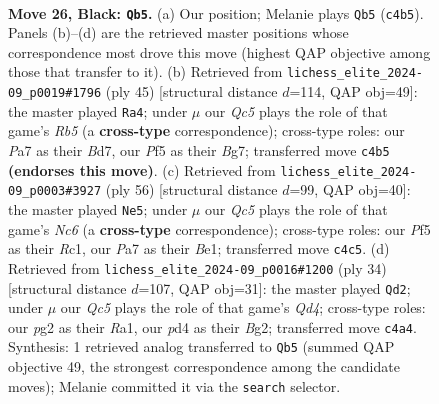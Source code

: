 \documentclass[11pt]{article}
\begin{document}
\clearpage

\begin{figure}[p]\centering
\begin{subfigure}{0.46\textwidth}\centering
\resizebox{\linewidth}{!}{%
\newchessgame
\chessboard[
  setfen={rk3b2/pp4pr/2p1b2p/P2p1p2/2qP3P/2BQPN2/1PK2PP1/1R4R1 b - - 4 26},
  showmover=false,
  pgfstyle=straightmove, color=movearrow, markmove={c4-b5}
]}
\caption{}
\end{subfigure}\hfill
\begin{subfigure}{0.46\textwidth}\centering
\resizebox{\linewidth}{!}{%
\newchessgame
\chessboard[
  setfen={4r1k1/1p1b1pbp/p1qp2p1/3Np3/1rP5/B3PQP1/5P1P/2R2RK1 b - - 3 23},
  showmover=false,
  pgfstyle=straightmove, color=movearrow, markmove={b4-a4}
]}
\caption{}
\end{subfigure}
\\[4pt]
\begin{subfigure}{0.46\textwidth}\centering
\resizebox{\linewidth}{!}{%
\newchessgame
\chessboard[
  setfen={r1r2bk1/5pp1/1pN1p2p/1q1p4/2nP4/p2QP1P1/P1R2PKP/2R1B3 w - - 0 29},
  showmover=false,
  pgfstyle=straightmove, color=movearrow, markmove={c6-e5}
]}
\caption{}
\end{subfigure}\hfill
\begin{subfigure}{0.46\textwidth}\centering
\resizebox{\linewidth}{!}{%
\newchessgame
\chessboard[
  setfen={rq3rk1/1p1n1ppp/p1bp4/P3p3/3QP3/2N3P1/1PP2PBP/R3R1K1 w - - 0 18},
  showmover=false,
  pgfstyle=straightmove, color=movearrow, markmove={d4-d2}
]}
\caption{}
\end{subfigure}
\caption{\textbf{Move 26, Black: \texttt{Qb5}.} (a) Our position; Melanie plays \texttt{Qb5} (\texttt{c4b5}). Panels (b)--(d) are the retrieved master positions whose correspondence most drove this move (highest QAP objective among those that transfer to it). (b) Retrieved from \texttt{lichess\_elite\_2024-09\_p0019\#1796} (ply 45) [structural distance $d$=114, QAP obj=49]: the master played \texttt{Ra4}; under $\mu$ our \emph{Qc5} plays the role of that game's \emph{Rb5} (a \textbf{cross-type} correspondence); cross-type roles: our \emph{P}a7 as their \emph{B}d7, our \emph{P}f5 as their \emph{B}g7; transferred move \texttt{c4b5} \textbf{(endorses this move)}. (c) Retrieved from \texttt{lichess\_elite\_2024-09\_p0003\#3927} (ply 56) [structural distance $d$=99, QAP obj=40]: the master played \texttt{Ne5}; under $\mu$ our \emph{Qc5} plays the role of that game's \emph{Nc6} (a \textbf{cross-type} correspondence); cross-type roles: our \emph{P}f5 as their \emph{R}c1, our \emph{P}a7 as their \emph{B}e1; transferred move \texttt{c4c5}. (d) Retrieved from \texttt{lichess\_elite\_2024-09\_p0016\#1200} (ply 34) [structural distance $d$=107, QAP obj=31]: the master played \texttt{Qd2}; under $\mu$ our \emph{Qc5} plays the role of that game's \emph{Qd4}; cross-type roles: our \emph{p}g2 as their \emph{R}a1, our \emph{p}d4 as their \emph{B}g2; transferred move \texttt{c4a4}. Synthesis: 1 retrieved analog transferred to \texttt{Qb5} (summed QAP objective 49, the strongest correspondence among the candidate moves); Melanie committed it via the \texttt{search} selector.}
\label{fig:thought-m51}
\end{figure}
\end{document}
